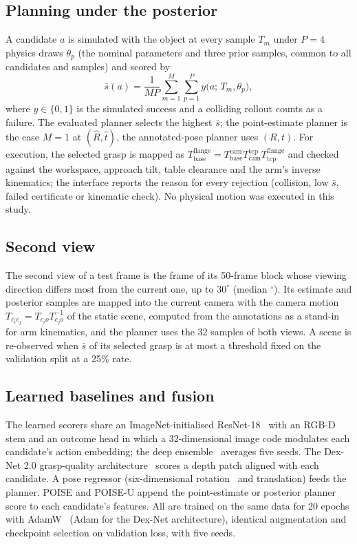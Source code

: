 \subsection{Planning under the posterior}
A candidate $a$ is simulated with the object at every sample $T_m$ under $P=4$ physics draws $\theta_p$ (the nominal parameters and three prior samples, common to all candidates and samples) and scored by
\begin{equation}
\bar s(a)=\frac{1}{MP}\sum_{m=1}^{M}\sum_{p=1}^{P} y\big(a;\,T_m,\theta_p\big),
\end{equation}
where $y\in\{0,1\}$ is the simulated success and a colliding rollout counts as a failure. The evaluated planner selects the highest $\bar s$; the point-estimate planner is the case $M=1$ at $(\hat R,\hat t)$, the annotated-pose planner uses $(R,t)$. For execution, the selected grasp is mapped as $T^{\mathrm{flange}}_{\mathrm{base}}=T^{\mathrm{cam}}_{\mathrm{base}}T^{\mathrm{tcp}}_{\mathrm{cam}}T^{\mathrm{flange}}_{\mathrm{tcp}}$ and checked against the workspace, approach tilt, table clearance and the arm's inverse kinematics; the interface reports the reason for every rejection (collision, low $\bar s$, failed certificate or kinematic check). No physical motion was executed in this study.

\subsection{Second view}
The second view of a test frame is the frame of its 50-frame block whose viewing direction differs most from the current one, up to $30^\circ$ (median \SvViewDeg$^\circ$). Its estimate and posterior samples are mapped into the current camera with the camera motion $T_{c_i c_j}=T_{c_i o}T_{c_j o}^{-1}$ of the static scene, computed from the annotations as a stand-in for arm kinematics, and the planner uses the 32 samples of both views. A scene is re-observed when $\bar s$ of its selected grasp is at most a threshold fixed on the validation split at a 25\% rate.

\subsection{Learned baselines and fusion}
The learned scorers share an ImageNet-initialised ResNet-18~\cite{he2016resnet,deng2009imagenet} with an RGB-D stem and an outcome head in which a 32-dimensional image code modulates each candidate's action embedding; the deep ensemble~\cite{lakshminarayanan2017} averages five seeds. The Dex-Net 2.0 grasp-quality architecture~\cite{mahler2017dexnet} scores a depth patch aligned with each candidate. A pose regressor (six-dimensional rotation~\cite{zhou2019rotation} and translation) feeds the planner. POISE and POISE-U append the point-estimate or posterior planner score to each candidate's features. All are trained on the same data for 20 epochs with AdamW~\cite{loshchilov2019adamw} (Adam for the Dex-Net architecture), identical augmentation and checkpoint selection on validation loss, with five seeds.

